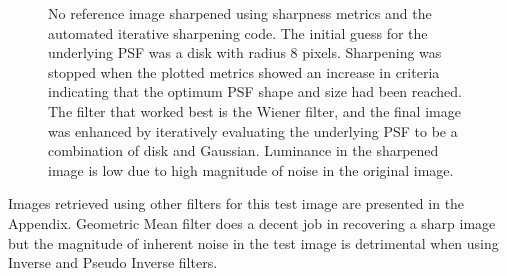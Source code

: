 \begin{figure}[H]
\begin{subfigure}[b]{0.49\textwidth}
        \end{subfigure}             
        \caption{ No reference image sharpened using sharpness metrics and the automated iterative sharpening code. The initial guess for the underlying PSF was a disk with radius 8 pixels. Sharpening was stopped when the plotted metrics showed an increase in criteria indicating that the optimum PSF shape and size had been reached. The filter that worked best is the Wiener filter, and the final image was enhanced by iteratively evaluating the underlying PSF to be a combination of disk and Gaussian. Luminance in the sharpened image is low due to high magnitude of noise in the original image.} \label{fig:true_metrics}
\end{figure}

Images retrieved using other filters for this test image are presented in the Appendix. Geometric Mean filter does a decent job in recovering a sharp image but the magnitude of inherent noise in the test image is detrimental when using Inverse and Pseudo Inverse filters.

\newpage